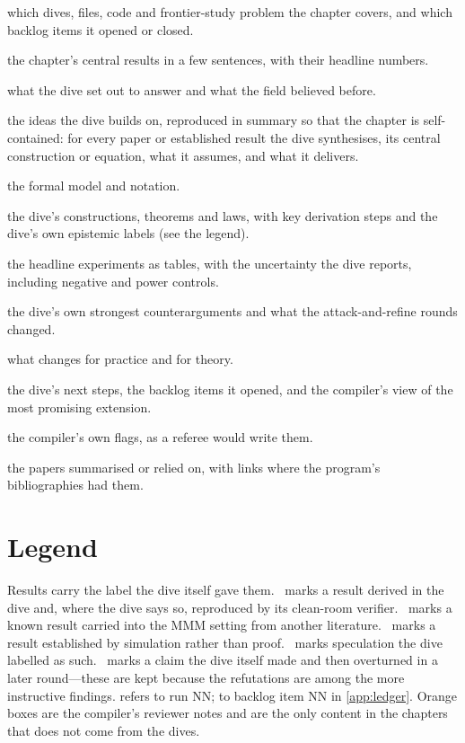 \begin{description}[leftmargin=1.6em,itemsep=1pt]
\item[Provenance] which dives, files, code and frontier-study problem the chapter covers, and which backlog items it opened or closed.
\item[Key ideas] the chapter's central results in a few sentences, with their headline numbers.
\item[Problem and motivation] what the dive set out to answer and what the field believed before.
\item[Background] the ideas the dive builds on, reproduced in summary so that the chapter is self-contained: for every paper or established result the dive synthesises, its central construction or equation, what it assumes, and what it delivers.
\item[Setup and assumptions] the formal model and notation.
\item[Main results] the dive's constructions, theorems and laws, with key derivation steps and the dive's own epistemic labels (see the legend).
\item[Numerical evidence] the headline experiments as tables, with the uncertainty the dive reports, including negative and power controls.
\item[Limitations and the devil's advocate] the dive's own strongest counterarguments and what the attack-and-refine rounds changed.
\item[Discussion: impacts] what changes for practice and for theory.
\item[Further exploration] the dive's next steps, the backlog items it opened, and the compiler's view of the most promising extension.
\item[Reviewer's notes] the compiler's own flags, as a referee would write them.
\item[Sources] the papers summarised or relied on, with links where the program's bibliographies had them.
\end{description}

\section*{Legend}

Results carry the label the dive itself gave them. \tagEstablished\ marks a result derived in the dive and, where
the dive says so, reproduced by its clean-room verifier. \tagTransported\ marks a known result carried into the
MMM setting from another literature. \tagNumerical\ marks a result established by simulation rather than proof.
\tagConjecture\ marks speculation the dive labelled as such. \tagRefuted\ marks a claim the dive itself made and
then overturned in a later round---these are kept because the refutations are among the more instructive
findings.  refers to run NN;  to backlog item NN in \cref{app:ledger}. Orange boxes are the
compiler's reviewer notes and are the only content in the chapters that does not come from the dives.

